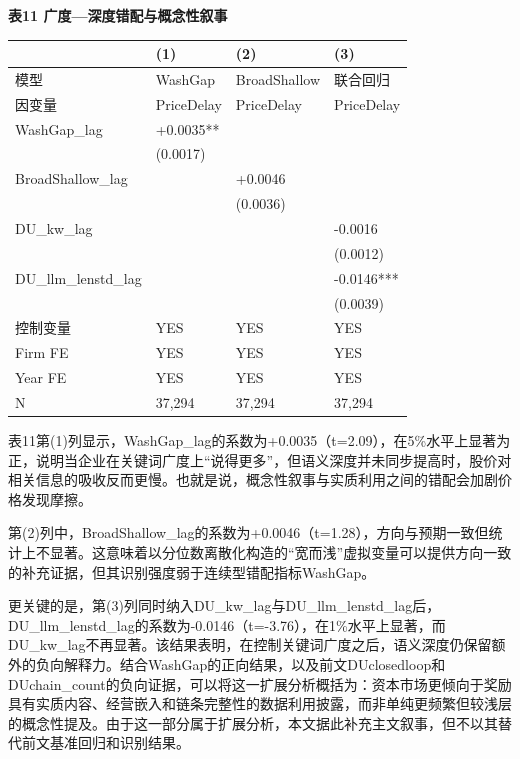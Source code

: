 \textbf{表11 广度---深度错配与概念性叙事}

{\def\LTcaptype{} %
\begin{longtable}[]{@{}llll@{}}
\toprule\noalign{}
& (1) & (2) & (3) \\
\midrule\noalign{}
\endhead
\bottomrule\noalign{}
\endlastfoot
模型 & WashGap & BroadShallow & 联合回归 \\
因变量 & PriceDelay & PriceDelay & PriceDelay \\
WashGap\_lag & +0.0035** & & \\
& (0.0017) & & \\
BroadShallow\_lag & & +0.0046 & \\
& & (0.0036) & \\
DU\_kw\_lag & & & -0.0016 \\
& & & (0.0012) \\
DU\_llm\_lenstd\_lag & & & -0.0146*** \\
& & & (0.0039) \\
控制变量 & YES & YES & YES \\
Firm FE & YES & YES & YES \\
Year FE & YES & YES & YES \\
N & 37,294 & 37,294 & 37,294 \\
\end{longtable}
}

表11第(1)列显示，WashGap\_lag的系数为+0.0035（t=2.09），在5\%水平上显著为正，说明当企业在关键词广度上``说得更多''，但语义深度并未同步提高时，股价对相关信息的吸收反而更慢。也就是说，概念性叙事与实质利用之间的错配会加剧价格发现摩擦。

第(2)列中，BroadShallow\_lag的系数为+0.0046（t=1.28），方向与预期一致但统计上不显著。这意味着以分位数离散化构造的``宽而浅''虚拟变量可以提供方向一致的补充证据，但其识别强度弱于连续型错配指标WashGap。

更关键的是，第(3)列同时纳入DU\_kw\_lag与DU\_llm\_lenstd\_lag后，DU\_llm\_lenstd\_lag的系数为-0.0146（t=-3.76），在1\%水平上显著，而DU\_kw\_lag不再显著。该结果表明，在控制关键词广度之后，语义深度仍保留额外的负向解释力。结合WashGap的正向结果，以及前文DUclosedloop和DUchain\_count的负向证据，可以将这一扩展分析概括为：资本市场更倾向于奖励具有实质内容、经营嵌入和链条完整性的数据利用披露，而非单纯更频繁但较浅层的概念性提及。由于这一部分属于扩展分析，本文据此补充主文叙事，但不以其替代前文基准回归和识别结果。
